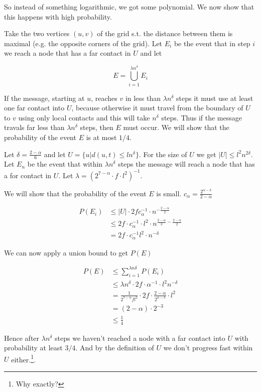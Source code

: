 \begin{pr}
So instead of something logarithmic, we got some polynomial. We now show that this happens with high probability.

Take the two vertices $(u,v)$ of the grid s.t. the distance between them is maximal (e.g. the opposite corners of the grid). Let $E_i$ be the event that in step $i$ we reach a node that has a far contact in $U$ and let 

\[E=\bigcup_{i=1}^{\lambda n^\delta} E_{i}\]

If the message, starting at $u$, reaches $v$ in less than $\lambda n ^\delta$ steps it must use at least one far contact into $U$, because otherwise it must travel from the boundary of $U$ to $v$ using only local contacts and this will take $n^\delta$ steps. Thus if the message travals far less than $\lambda n^\delta$ steps, then $E$ must occur. We will show that the probability of the event $E$ is at most $1/4$.

Let $\delta = \frac{2-\alpha}{6}$ and let $U=\{u|d(u,t) \leq ln^\delta\}$. For the size of $U$ we get $|U| \leq l^2n^{2\delta}$. Let $E_n$ be the event that within $\lambda n^\delta$ steps the message will reach a node that has a for contact in $U$. Let $\lambda = (2^{7-\alpha} \cdot f \cdot l^2)^{-1}$. 


We will show that the probability of the event $E$ is small. $c_\alpha = \frac{2^{\alpha-3}}{2-\alpha}$

\begin{align*}
P(E_i) &\leq |U| \cdot 2fc_\alpha^{-1} \cdot n^{-\frac{2-\alpha}{2}}\\
	&\leq 2f\cdot c_\alpha^{-1} \cdot l^2 \cdot n^{\frac{2-\alpha}{3} -\frac{2-\alpha}{2}}\\
	&=2f\cdot c_\alpha ^{-1} l^2 \cdot n^{-\delta}
\end{align*}

We can now apply a union bound to get $P(E)$

\begin{align*}
P(E) &\leq\sum_{i=1}^{\lambda n\delta} P(E_i)\\
	&\leq  \lambda n^\delta \cdot 2f\cdot \alpha^{-1} \cdot l^2 n^{-\delta}\\
	&= \frac{1}{2^{7-\alpha} fl^2} \cdot 2f\cdot \frac{2-\alpha}{2^{\alpha-3}} \cdot l^2\\
	&=(2-\alpha)\cdot 2^{-3}\\
	&\leq \frac{1}{4}
\end{align*}

Hence after $\lambda n^\delta$ steps we haven't reached a node with a far contact into $U$ with probability at least $3/4$. And by the definition of $U$ we don't progress fast within $U$ either.\footnote{Why exactly?}.
\end{pr}
